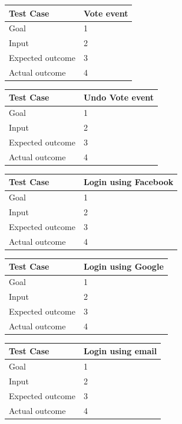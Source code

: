 \documentclass[a4paper]{scrreprt}
\begin{document}
\bigskip
\noindent
\begin{tabularx}{\linewidth}{|l|X|}
	\hline
	\textbf{Test Case} 	& \textbf{Vote event} \\ \hline
	Goal 				& 1 \\ \hline
	Input 				& 2 \\ \hline
	Expected outcome 	& 3 \\ \hline
	Actual outcome 		& 4 \\ \hline
\end{tabularx}
\bigskip
\noindent
\begin{tabularx}{\linewidth}{|l|X|}
	\hline
	\textbf{Test Case} 	& \textbf{Undo Vote event} \\ \hline
	Goal 				& 1 \\ \hline
	Input 				& 2 \\ \hline
	Expected outcome 	& 3 \\ \hline
	Actual outcome 		& 4 \\ \hline
\end{tabularx}
\bigskip
\noindent
\begin{tabularx}{\linewidth}{|l|X|}
	\hline
	\textbf{Test Case} 	& \textbf{Login using Facebook} \\ \hline
	Goal 				& 1 \\ \hline
	Input 				& 2 \\ \hline
	Expected outcome 	& 3 \\ \hline
	Actual outcome 		& 4 \\ \hline
\end{tabularx}
\bigskip
\noindent
\begin{tabularx}{\linewidth}{|l|X|}
	\hline
	\textbf{Test Case} 	& \textbf{Login using Google} \\ \hline
	Goal 				& 1 \\ \hline
	Input 				& 2 \\ \hline
	Expected outcome 	& 3 \\ \hline
	Actual outcome 		& 4 \\ \hline
\end{tabularx}
\bigskip
\noindent
\begin{tabularx}{\linewidth}{|l|X|}
	\hline
	\textbf{Test Case} 	& \textbf{Login using email} \\ \hline
	Goal 				& 1 \\ \hline
	Input 				& 2 \\ \hline
	Expected outcome 	& 3 \\ \hline
	Actual outcome 		& 4 \\ \hline
\end{tabularx}
\end{document}
